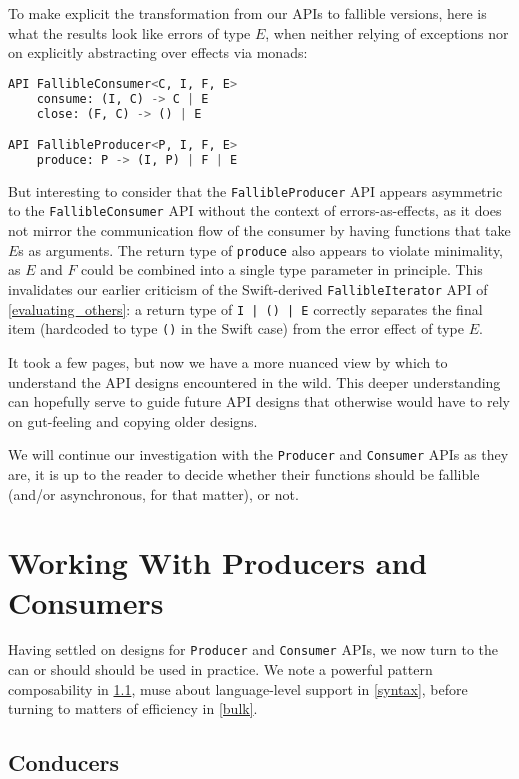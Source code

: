 \documentclass[sigplan,screen,10pt,anonymous,review]{acmart}
\begin{document}
To make explicit the transformation from our APIs to fallible versions, here is what the results look like errors of type $E$, when neither relying of exceptions nor on explicitly abstracting over effects via monads:

\begin{lstlisting}[language=Python]
API FallibleConsumer<C, I, F, E>
    consume: (I, C) -> C | E
    close: (F, C) -> () | E

API FallibleProducer<P, I, F, E>
    produce: P -> (I, P) | F | E
\end{lstlisting}

But interesting to consider that the \texttt{FallibleProducer} API appears asymmetric to the \texttt{FallibleConsumer} API without the context of errors-as-effects, as it does not mirror the communication flow of the consumer by having functions that take $E$s as arguments. The return type of \texttt{produce} also appears to violate minimality, as $E$ and $F$ could be combined into a single type parameter in principle. This invalidates our earlier criticism of the Swift-derived \texttt{FallibleIterator} API of \cref{evaluating_others}: a return type of \texttt{I | () | E} correctly separates the final item (hardcoded to type \texttt{()} in the Swift case) from the error effect of type $E$.

It took a few pages, but now we have a more nuanced view by which to understand the API designs encountered in the wild. This deeper understanding can hopefully serve to guide future API designs that otherwise would have to rely on gut-feeling and copying older designs.

We will continue our investigation with the \texttt{Producer} and \texttt{Consumer} APIs as they are, it is up to the reader to decide whether their functions should be fallible (and/or asynchronous, for that matter), or not.

\section{Working With Producers and Consumers}

Having settled on designs for \texttt{Producer} and \texttt{Consumer} APIs, we now turn to the can or should should be used in practice. We note a powerful pattern composability in \cref{conducer}, muse about language-level support in \cref{syntax}, before turning to matters of efficiency in \cref{bulk}.

\subsection{Conducers}\label{conducer}
\end{document}
